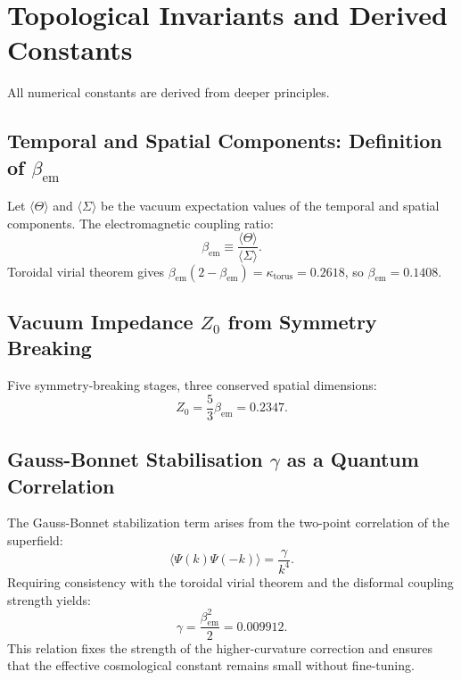 \documentclass[12pt, a4paper]{article}
\begin{document}
\section{Topological Invariants and Derived Constants}
\label{sec:topology}
All numerical constants are derived from deeper principles.

\subsection{Temporal and Spatial Components: Definition of $\beta_{\mathrm{em}}$}
Let $\langle \Theta \rangle$ and $\langle \Sigma \rangle$ be the vacuum expectation values of the temporal and spatial components. The electromagnetic coupling ratio:
\begin{equation}
\beta_{\mathrm{em}} \equiv \frac{\langle \Theta \rangle}{\langle \Sigma \rangle}.
\label{eq:beta_def}
\end{equation}
Toroidal virial theorem gives $\beta_{\mathrm{em}}(2 - \beta_{\mathrm{em}}) = \kappa_{\mathrm{torus}} = 0.2618$, so $\beta_{\mathrm{em}} = 0.1408$.

\subsection{Vacuum Impedance $Z_0$ from Symmetry Breaking}
Five symmetry-breaking stages, three conserved spatial dimensions:
\begin{equation}
Z_0 = \frac{5}{3} \beta_{\mathrm{em}} = 0.2347.
\label{eq:Z0}
\end{equation}

\subsection{Gauss-Bonnet Stabilisation $\gamma$ as a Quantum Correlation}
The Gauss-Bonnet stabilization term arises from the two-point correlation of the superfield:
\begin{equation}
\langle \Psi(k) \Psi(-k) \rangle = \frac{\gamma}{k^4}.
\end{equation}
Requiring consistency with the toroidal virial theorem and the disformal coupling strength yields:
\begin{equation}
\gamma = \frac{\beta_{\mathrm{em}}^2}{2} = 0.009912.
\label{eq:gamma}
\end{equation}
This relation fixes the strength of the higher-curvature correction and ensures that the effective cosmological constant remains small without fine-tuning.
\end{document}
